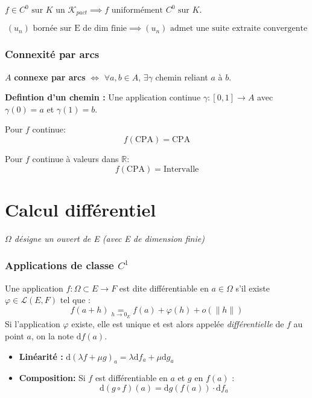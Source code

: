 \documentclass[a4paper,12pt]{report}
\newcommand{\Def}[2]{\begin{tcolorbox}[colback=white,colframe=CornflowerBlue, title=Définition : #1]#2\end{tcolorbox}}
\newcommand{\Thm}[2]{\begin{tcolorbox}[colback=white,colframe=Red!60, title=Théorème : #1]#2\end{tcolorbox}}
\def\R{\mathbb{R}}
\newcommand{\ssi}{\Longleftrightarrow}
\begin{document}
\Thm{de Heine}{
\centering
$f\in C^0 \text{ sur } K \text{ un }\mathcal{K}_{pact} \implies f \text{ uniformément } C^0 \text{ sur } K$.
}

\Thm{de Bolzano Weierstrass}{
\[(u_n) \text{ bornée sur E de dim finie} \implies (u_n) \text{ admet une suite extraite convergente}\]
}

\subsubsection{Connexité par arcs}
\Def{Connexité par arc}{
\begin{center}
    \( A \) \textbf{connexe par arcs} $\ssi$ \(\forall a, b \in A \), \(\exists\gamma\) chemin reliant \( a \) à \( b \).
\end{center}
\textbf{Defintion d'un chemin :} Une application continue \( \gamma : [0,1] \to A \) avec \( \gamma(0) = a \) et \( \gamma(1) = b \).
}

\Thm{Image d'un connexe}{
Pour $f$ continue:
    \[f(\text{CPA}) = \text{CPA}\]
}

\Thm{TVI}{
Pour $f$ continue à valeurs dans $\R$:
    \[f(\text{CPA}) = \text{Intervalle}\]
}

\section{Calcul différentiel}
\textit{$\Omega$ désigne un ouvert de E (avec E de dimension finie) }
\subsubsection{Applications de classe $C^1$}
\Def{Différentielle en un point}{
Une application $f : \Omega \subset E \to F$ est dite différentiable en $a \in \Omega$ s'il existe $\varphi \in \mathcal{L}(E, F)$ tel que :
\[ f(a+h) \underset{h \to 0_E}{=} f(a) + \varphi(h) + o(\|h\|)\]
Si l'application $\varphi$ existe, elle est unique et est alors appelée \textit{différentielle} de $f$ au point $a$, on la note $\mathrm{d}f(a)$.
}

\Thm{Opération usuelles}{
\begin{itemize}
    \item \textbf{Linéarité :} $\mathrm{d}(\lambda f + \mu g)_a = \lambda \mathrm{d}f_a + \mu \mathrm{d}g_a$
    
    \item \textbf{Composition:} Si $f$ est différentiable en $a$ et $g$ en $f(a)$ :
    \[ \mathrm{d}(g \circ f)(a) = \mathrm{d}g({f(a)}) \cdot  \mathrm{d}f_a \]
\end{itemize}
}
\end{document}
